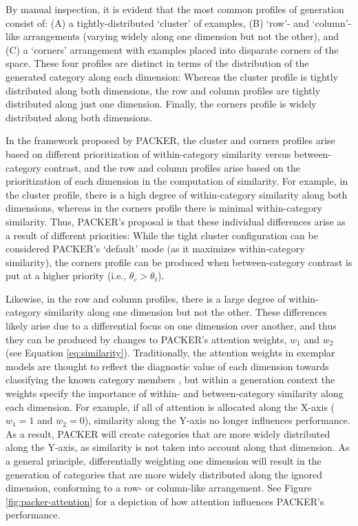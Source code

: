 \documentclass[12pt]{article}
\begin{document}
\begin{flushleft}
By manual inspection, it is evident that the most common profiles of generation
consist of: (A) a tightly-distributed `cluster' of examples, (B) `row'- and
`column'-like arrangements (varying widely along one dimension but not the
other), and (C) a `corners' arrangement with examples placed into disparate
corners of the space. These four profiles are distinct in terms of the
distribution of the generated category along each dimension: Whereas the cluster
profile is tightly distributed along both dimensions, the row and column
profiles are tightly distributed along just one dimension. Finally, the corners
profile is widely distributed along both dimensions.

In the framework proposed by PACKER, the cluster and corners profiles arise
based on different prioritization of within-category similarity versus
between-category contrast, and the row and column profiles arise based on the
prioritization of each dimension in the computation of similarity. For example,
in the cluster profile, there is a high degree of within-category similarity
along both dimensions, whereas in the corners profile there is minimal
within-category similarity. Thus, PACKER's proposal is that these individual
differences arise as a result of different priorities: While the tight cluster
configuration can be considered PACKER's `default' mode (as it maximizes
within-category similarity), the corners profile can be produced when
between-category contrast is put at a higher priority (i.e., $\theta_c > \theta_t$).

Likewise, in the row and column profiles, there is a large degree of
within-category similarity along one dimension but not the other. These
differences likely arise due to a differential focus on one dimension over
another, and thus they can be produced by changes to PACKER's attention weights,
$w_1$ and $w_2$ (see Equation \ref{eq:similarity}). Traditionally, the attention
weights in exemplar models are thought to reflect the diagnostic value of each
dimension towards classifying the known category members
\citep{nosofsky1984choice,nosofsky1986attention,kruschke1992alcove}, but within
a generation context the weights specify the importance of within- and
between-category similarity along each dimension. For example, if all of
attention is allocated along the X-axis ($w_1=1$ and $w_2=0$), similarity along
the Y-axis no longer influences performance. As a result, PACKER will create
categories that are more widely distributed along the Y-axis, as similarity is
not taken into account along that dimension. As a general principle,
differentially weighting one dimension will result in the generation of
categories that are more widely distributed along the ignored dimension,
conforming to a row- or column-like arrangement. See Figure
\ref{fig:packer-attention} for a depiction of how attention influences PACKER's
performance.


\end{flushleft}
\end{document}
